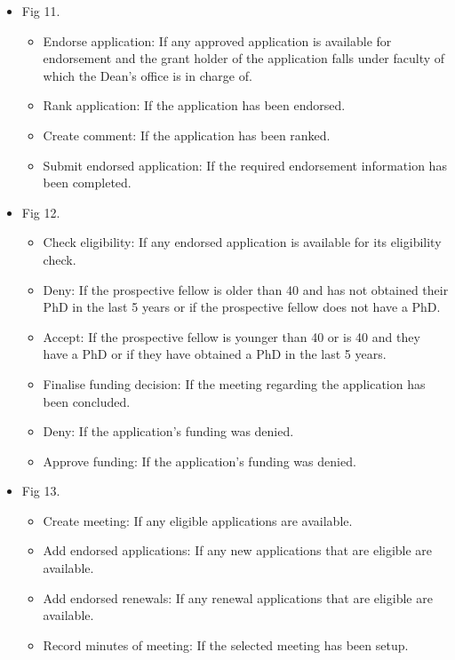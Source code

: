 \documentclass[12pt]{article}
\begin{document}
\begin{itemize}
	\item Fig 11.
		\begin{itemize}
			\item Endorse application: If any approved application is available for endorsement and the grant holder of the application falls under faculty of which the Dean's office is in charge of.
			\item Rank application: If the application has been endorsed.	
			\item Create comment: If the application has been ranked.			
			\item Submit endorsed application: If the required endorsement information has been completed.									
		\end{itemize}
	
	\item Fig 12.
		\begin{itemize}
			\item Check eligibility: If any endorsed application is available for its eligibility check.
			\item Deny: If the prospective fellow is older than 40 and has not obtained their PhD in the last 5 years or if the prospective fellow does not have a PhD.
			\item Accept: If the prospective fellow is younger than 40 or is 40 and they have a PhD or if they have obtained a PhD in the last 5 years. 
			\item Finalise funding decision: If the meeting regarding the application has been concluded.	
			\item Deny: If the application's funding was denied.			
			\item Approve funding: If the application's funding was denied.									
		\end{itemize}
	
	\item Fig 13.
		\begin{itemize}
			\item Create meeting: If any eligible applications are available.
			\item Add endorsed applications: If any new applications that are eligible are available.
			\item Add endorsed renewals: If any renewal applications that are eligible are available.
			\item Record minutes of meeting: If the selected meeting has been setup.							
		\end{itemize}
	\end{itemize}
\end{document}
